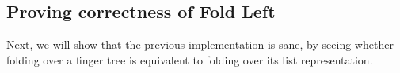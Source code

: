 \documentclass[12pt,twoside,notitlepage]{report}
\begin{document}
\subsection{Proving correctness of Fold Left}

Next, we will show that the previous implementation is sane, by seeing whether folding over a finger tree is equivalent to folding over its list representation.

\begin{code}
\\
\> \AgdaSymbol{:}  \AgdaSymbol{\{}\AgdaSymbol{\}} \AgdaSymbol{\{} \AgdaSymbol{:}  \AgdaSymbol{\}\{} \AgdaSymbol{:}  \AgdaSymbol{\}}\<%
\\
\>[2]\<[14]%
\>[14]\AgdaSymbol{\{} \AgdaSymbol{:}  \AgdaSymbol{\}}\<%
\\
\>[2]\<[14]%
\>[14]  \AgdaSymbol{:}   \<%
\\
\>[2]\<[14]%
\>[14]  \AgdaSymbol{:}    \<%
\\
\>[2]\<[14]%
\>[14] \AgdaSymbol{\{} \AgdaSymbol{:} \AgdaSymbol{\}}\<%
\\
\>[2]\<[14]%
\>[14] \AgdaSymbol{(} \AgdaSymbol{:}     \AgdaSymbol{)}\<%
\\
\>[2]\<[14]%
\>[14] \AgdaSymbol{(} \AgdaSymbol{:} \AgdaSymbol{)}\<%
\\
\>[2]\<[14]%
\>[14] \AgdaSymbol{(} \AgdaSymbol{:}    \AgdaSymbol{\{}\AgdaSymbol{\})}\<%
\\
\>[2]\<[14]%
\>[14] \AgdaSymbol{(}        \AgdaSymbol{(} \AgdaSymbol{))}\<%
\\
\end{code}
\end{document}
